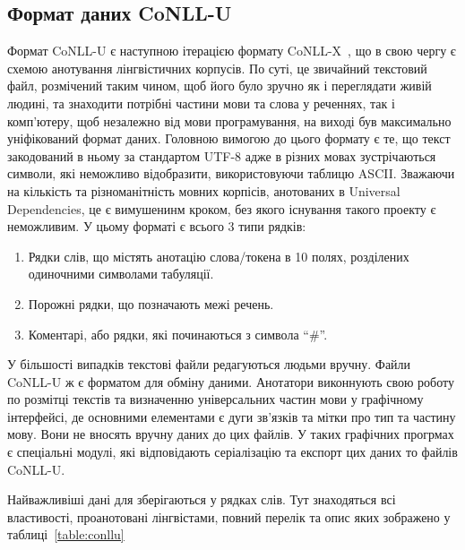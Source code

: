 \subsection{Формат даних CoNLL-U}
Формат CoNLL-U є наступною ітерацією формату CoNLL-X~\cite{bib11},
що в свою чергу є схемою анотування лінгвістичних корпусів.
По суті, це звичайний текстовий файл, розмічений таким чином, щоб
його було зручно як і переглядати живій людині, та знаходити потрібні
частини мови та слова у реченнях, так і комп'ютеру, щоб незалежно
від мови програмування, на виході був максимально уніфікований формат даних.
Головною вимогою до цього формату є те, що текст закодований в ньому за
стандартом UTF-8 адже в різних мовах зустрічаються символи, які
неможливо відобразити, використовуючи таблицю ASCII. Зважаючи на
кількість та різноманітність мовних корпісів, анотованих в Universal Dependencies,
це є вимушенинм кроком, без якого існування такого проекту є неможливим.
У цьому форматі є всього 3 типи рядків:

\begin{enumerate}
    \item Рядки слів, що містять анотацію слова/токена в 10 полях, розділених
    одиночними символами табуляції.
    \item Порожні рядки, що позначають межі речень.
    \item Коментарі, або рядки, які починаються з символа ``\#''.
\end{enumerate}

У більшості випадків текстові файли редагуються людьми вручну. Файли
CoNLL-U ж є форматом для обміну даними. Анотатори виконнують свою
роботу по розмітці текстів та визначенню універсальних частин мови
у графічному інтерфейсі, де основними елементами є дуги зв'язків
та мітки про тип та частину мову. Вони не вносять вручну даних до
цих файлів. У таких графічних прогрмах є спеціальні модулі,
які відповідають серіалізацію та експорт цих даних то файлів CoNLL-U.

Найважливіші дані для зберігаються у рядках слів. Тут знаходяться всі властивості,
проанотовані лінгвістами, повний перелік та опис яких зображено у
таблиці~\ref{table:conllu}

